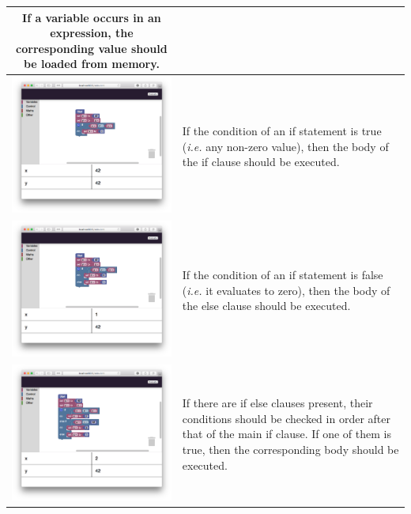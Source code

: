 \begin{center}
\begin{longtable}[t]{|c|p{5cm}|}
		If a variable occurs in an expression, the corresponding value should be loaded from memory. \\ \hline 
		\includegraphics[align=t,width=250px]{cswk/3-if.png} &
		If the condition of an if statement is true (\emph{i.e.} any non-zero value), then the body of the if clause should be executed. \\ \hline
		\includegraphics[align=t,width=250px]{cswk/4-else.png} &
		If the condition of an if statement is false (\emph{i.e.} it evaluates to zero), then the body of the else clause should be executed. \\ \hline 
		\includegraphics[align=t,width=250px]{cswk/5-ifelse.png} &
		If there are if else clauses present, their conditions should be checked in order after that of the main if clause. If one of them is true, then the corresponding body should be executed. \\ \hline

\end{longtable}
\end{center}

